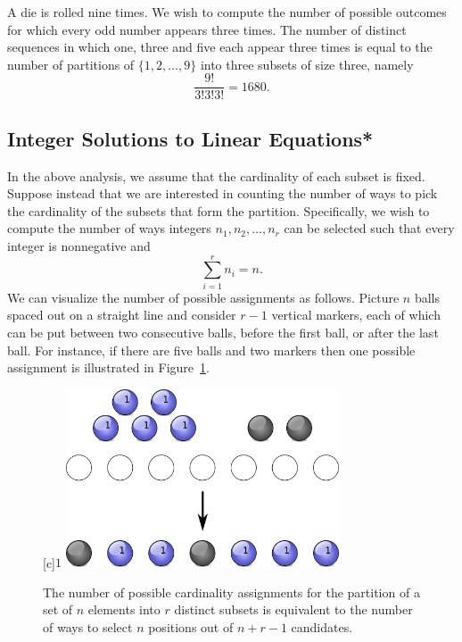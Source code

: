 \begin{example}
A die is rolled nine times.
We wish to compute the number of possible outcomes for which every odd number appears three times.
The number of distinct sequences in which one, three and five each appear three times is equal to the number of partitions of $\{ 1, 2, \ldots, 9 \}$ into three subsets of size three, namely
\begin{equation*}
\frac{9!}{3! 3! 3!} = 1680 .
\end{equation*}
\end{example}


\subsection{Integer Solutions to Linear Equations*}

In the above analysis, we assume that the cardinality of each subset is fixed.
Suppose instead that we are interested in counting the number of ways to pick the cardinality of the subsets that form the partition. 
Specifically, we wish to compute the number of ways integers $n_1, n_2, \ldots, n_r$ can be selected such that every integer is nonnegative and
\begin{equation*}
\sum_{i = 1}^r n_i = n.
\end{equation*}
We can visualize the number of possible assignments as follows.
Picture $n$ balls spaced out on a straight line and consider $r-1$ vertical markers, each of which can be put between two consecutive balls, before the first ball, or after the last ball. 
For instance, if there are five balls and two markers then one possible assignment is illustrated in Figure~\ref{figure:Partitioning}.

\begin{figure}[htb!]
\begin{center}
\begin{psfrags}
[c]{$1$}
\includegraphics[height=5.28cm]{Figures/4Chapter/partitioning}
\end{psfrags}
\caption{The number of possible cardinality assignments for the partition of a set of $n$ elements into $r$ distinct subsets is equivalent to the number of ways to select $n$ positions out of $n + r - 1$ candidates.} 
\label{figure:Partitioning}
\end{center}
\end{figure}

